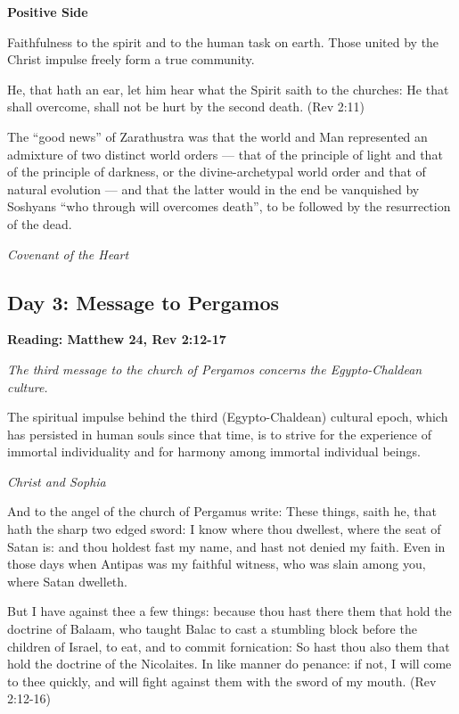 \textbf{Positive Side}

Faithfulness to the spirit and to the human task on earth. Those united by the Christ impulse freely form a true
community.

He, that hath an ear, let him hear what the Spirit saith to the churches: He that shall overcome, shall not be hurt by
the second death. (Rev 2:11)

\begin{quotationx}
The “good news” of Zarathustra was that the world and Man represented an admixture of two distinct world orders
— that of the principle of light and that of the principle of darkness, or the divine-archetypal
world order and that of natural evolution — and that the latter would in the end be vanquished by
Soshyans “who through will overcomes death”, to be followed by the resurrection of the dead. \begin{flushright} \emph{Covenant of the
Heart}\end{flushright}

\end{quotationx}

\subsection*{Day 3: Message to Pergamos}
\textbf{Reading: Matthew 24, Rev 2:12-17}

\emph{The third message to the church of Pergamos concerns the Egypto-Chaldean culture.}

\begin{quotationx}
The spiritual impulse behind the third (Egypto-Chaldean) cultural epoch, which has persisted in human souls since that
time, is to strive for the experience of immortal individuality and for harmony among immortal individual beings. \begin{flushright}
\emph{Christ and Sophia}\end{flushright}

\end{quotationx}
And to the angel of the church of Pergamus write: These things, saith he, that hath the sharp two edged sword: I know
where thou dwellest, where the seat of Satan is: and thou holdest fast my name, and hast not denied my faith. Even in
those days when Antipas was my faithful witness, who was slain among you, where Satan dwelleth.

But I have against thee a few things: because thou hast there them that hold the doctrine of Balaam, who taught Balac to
cast a stumbling block before the children of Israel, to eat, and to commit fornication: So hast thou also them that
hold the doctrine of the Nicolaites. In like manner do penance: if not, I will come to thee quickly, and will fight
against them with the sword of my mouth. (Rev 2:12-16)

